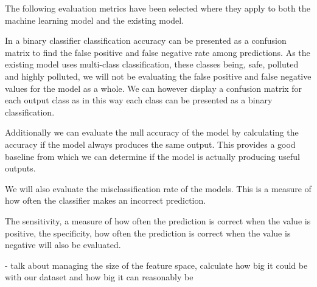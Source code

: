 The following evaluation metrics have been selected where they apply to both the machine learning model and the existing model.

In a binary classifier classification accuracy can be presented as a confusion matrix to find the false positive and false negative rate among predictions. As the existing model uses multi-class classification, these classes being, safe, polluted and highly polluted, we will not be evaluating the false positive and false negative values for the model as a whole. We can however display a confusion matrix for each output class as in this way each class can be presented as a binary classification.

Additionally we can evaluate the null accuracy of the model by calculating the accuracy if the model always produces the same output. This provides a good baseline from which we can determine if the model is actually producing useful outputs.

We will also evaluate the misclassification rate of the models. This is a measure of how often the classifier makes an incorrect prediction.

The sensitivity, a measure of how often the prediction is correct when the value is positive, the specificity, how often the prediction is correct when the value is negative will also be evaluated.


- talk about managing the size of the feature space, calculate how big it could be with our dataset and how big it can reasonably be



